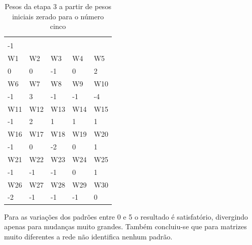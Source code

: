 \documentclass[11pt]{article}
\begin{document}
\begin{table}[]
\centering
\caption{Pesos da etapa 3 a partir de pesos iniciais zerado para o número cinco}
\label{tab:wp5z_3}
\begin{tabular}{lllll}
\cellcolor[HTML]{000000}{\color[HTML]{FFFFFF} W0} &                            &                            &                            &                            \\
-1                                                &                            &                            &                            &                            \\
\rowcolor[HTML]{000000}
{\color[HTML]{FFFFFF} W1}                         & {\color[HTML]{FFFFFF} W2}  & {\color[HTML]{FFFFFF} W3}  & {\color[HTML]{FFFFFF} W4}  & {\color[HTML]{FFFFFF} W5}  \\
0                                                 & 0                          & -1                         & 0                          & 2                          \\
\rowcolor[HTML]{000000}
{\color[HTML]{FFFFFF} W6}                         & {\color[HTML]{FFFFFF} W7}  & {\color[HTML]{FFFFFF} W8}  & {\color[HTML]{FFFFFF} W9}  & {\color[HTML]{FFFFFF} W10} \\
-1                                                & 3                          & -1                         & -1                         & -4                         \\
\rowcolor[HTML]{000000}
{\color[HTML]{FFFFFF} W11}                        & {\color[HTML]{FFFFFF} W12} & {\color[HTML]{FFFFFF} W13} & {\color[HTML]{FFFFFF} W14} & {\color[HTML]{FFFFFF} W15} \\
-1                                                & 2                          & 1                          & 1                          & 1                          \\
\rowcolor[HTML]{000000}
{\color[HTML]{FFFFFF} W16}                        & {\color[HTML]{FFFFFF} W17} & {\color[HTML]{FFFFFF} W18} & {\color[HTML]{FFFFFF} W19} & {\color[HTML]{FFFFFF} W20} \\
-1                                                & 0                          & -2                         & 0                          & 1                          \\
\rowcolor[HTML]{000000}
{\color[HTML]{FFFFFF} W21}                        & {\color[HTML]{FFFFFF} W22} & {\color[HTML]{FFFFFF} W23} & {\color[HTML]{FFFFFF} W24} & {\color[HTML]{FFFFFF} W25} \\
-1                                                & -1                         & -1                         & 0                          & 1                          \\
\rowcolor[HTML]{000000}
{\color[HTML]{FFFFFF} W26}                        & {\color[HTML]{FFFFFF} W27} & {\color[HTML]{FFFFFF} W28} & {\color[HTML]{FFFFFF} W29} & {\color[HTML]{FFFFFF} W30} \\
-2                                                & -1                         & -1                         & -1                         & 0
\end{tabular}
\end{table}

Para as variações dos padrões entre 0 e 5 o resultado é satisfatório, divergindo
apenas para mudanças muito grandes. Também concluiu-se que para matrizes muito
diferentes a rede não identifica nenhum padrão.
\end{document}
